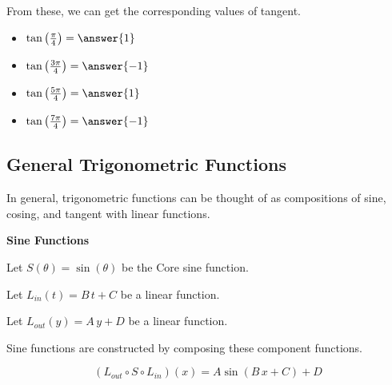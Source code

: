 \documentclass{ximera}
\begin{document}
From these, we can get the corresponding values of tangent.



\begin{question}



\begin{itemize}
\item $\tan\left(\frac{\pi}{4}\right) = \answer{1}$ 
\item $\tan\left(\frac{3\pi}{4}\right) = \answer{-1}$ 
\item $\tan\left(\frac{5\pi}{4}\right) = \answer{1}$ 
\item $\tan\left(\frac{7\pi}{4}\right) = \answer{-1}$ 
\end{itemize}



\end{question}







\subsection*{General Trigonometric Functions}


In general, trigonometric functions can be thought of as compositions of sine, cosing, and tangent with linear functions.




\begin{idea} \textbf{\textcolor{blue!55!black}{Sine Functions}}


Let $S(\theta) = \sin(\theta)$ be the Core sine function.

Let $L_{in}(t) = B \, t + C$ be a linear function.

Let $L_{out}(y) = A \, y + D$ be a linear function.



Sine functions are constructed by composing these component functions.


\[
(L_{out} \circ S \circ L_{in})(x) = A \sin(B \,x + C) + D
\]




\end{idea}
\end{document}
